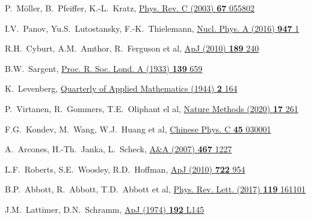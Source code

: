 \begin{thebibliography}{9}
P.~M\"oller, B.~Pfeiffer, K.-L.~Kratz,
\href{https://link.aps.org/doi/10.1103/PhysRevC.67.055802}
  {Phys. Rev. C (2003) \textbf{67} 055802}

I.V.~Panov, Yu.S.~Lutostansky, F.-K.~Thielemann,
\href{https://doi.org/10.1016/j.nuclphysa.2015.12.001}
  {Nucl. Phys. A (2016) \textbf{947} 1}

R.H.~Cyburt, A.M.~Amthor, R.~Ferguson et al,
\href{https://doi.org/10.1088/0067-0049/189/1/240}
  {ApJ (2010) \textbf{189} 240}

B.W.~Sargent,
\href{https://doi.org/10.1098/rspa.1933.0045}
  {Proc. R. Soc. Lond. A (1933) \textbf{139} 659}

K.~Levenberg,
\href{https://doi.org/10.1090/qam/10666}
  {Quarterly of Applied Mathematics (1944) \textbf{2} 164}

P.~Virtanen, R.~Gommers, T.E.~Oliphant el al,
\href{https://doi.org/10.1038/s41592-019-0686-2}
  {Nature Methods (2020) \textbf{17} 261}

 F.G.~Kondev, M.~Wang, W.J.~Huang et al,
 \href{https://doi.org/10.1088/1674-1137/abddae}
  {Chinese Phys. C \textbf{45} 030001}

A.~Arcones, H.-Th.~Janka, L.~Scheck, 
\href{https://doi.org/10.1051/0004-6361%3A20066983}
  {A\&A  (2007) \textbf{467} 1227}

L.F.~Roberts, S.E.~Woosley, R.D.~Hoffman, 
\href{https://doi.org/10.1088/0004-637X/722/1/954}
  {ApJ  (2010) \textbf{722} 954}

B.P.~Abbott, R.~Abbott, T.D.~Abbott et al,
\href{https://doi.org/10.1103/PhysRevLett.119.161101}
  {Phys. Rev. Lett. (2017) \textbf{119} 161101}

J.M.~Lattimer, D.N.~Schramm, 
\href{https://doi.org/10.1086/181612}
  {ApJ  (1974) \textbf{192} L145}


\end{thebibliography}

